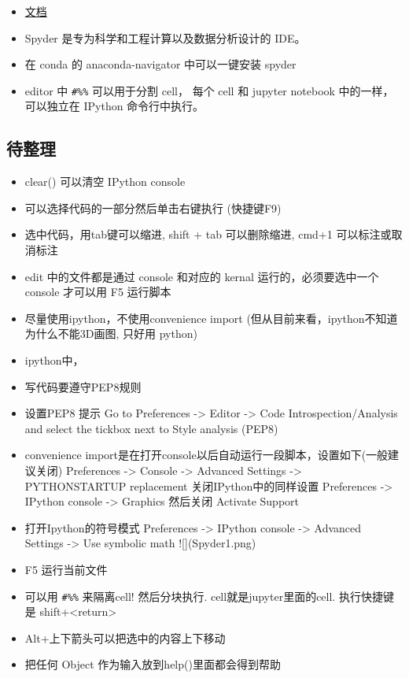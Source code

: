 
\begin{issues}
\issueDraft
\end{issues}

\begin{itemize}
\item \href{https://docs.spyder-ide.org/current/}{文档}
\item Spyder 是专为科学和工程计算以及数据分析设计的 IDE。
\item 在 conda 的 anaconda-navigator 中可以一键安装 spyder
\item editor 中 \verb|#%%| 可以用于分割 cell， 每个 cell 和 jupyter notebook 中的一样， 可以独立在 IPython 命令行中执行。
\end{itemize}

\subsection{待整理}
\begin{itemize}
\item clear() 可以清空 IPython console
\item 可以选择代码的一部分然后单击右键执行 (快捷键F9)
\item 选中代码，用tab键可以缩进, shift + tab 可以删除缩进, cmd+1 可以标注或取消标注
\item edit 中的文件都是通过 console 和对应的 kernal 运行的，必须要选中一个 console 才可以用 F5 运行脚本
\item 尽量使用ipython，不使用convenience import (但从目前来看，ipython不知道为什么不能3D画图, 只好用 python)
\item ipython中，%
\item 写代码要遵守PEP8规则
\item 设置PEP8 提示
  Go to Preferences -> Editor -> Code Introspection/Analysis and select the tickbox next to Style analysis (PEP8)
\item convenience import是在打开console以后自动运行一段脚本，设置如下(一般建议关闭)
   Preferences -> Console -> Advanced Settings -> PYTHONSTARTUP replacement
   关闭IPython中的同样设置
   Preferences -> IPython console -> Graphics 然后关闭 Activate Support
\item 打开Ipython的符号模式
   Preferences -> IPython console -> Advanced Settings -> Use symbolic math
![](Spyder1.png)

\item F5 运行当前文件
\item 可以用 \verb|#%%| 来隔离cell! 然后分块执行. cell就是jupyter里面的cell. 执行快捷键是 shift+<return>
\item Alt+上下箭头可以把选中的内容上下移动
\item 把任何 Object 作为输入放到help()里面都会得到帮助
\end{itemize}
